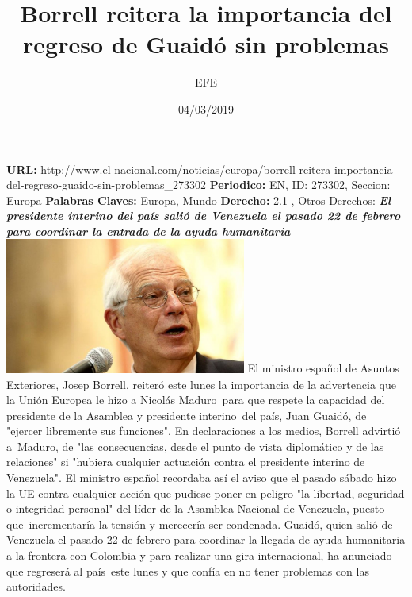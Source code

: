 \documentclass{article}%
\title{\textbf{Borrell reitera la importancia del regreso de Guaidó sin problemas}}%
\author{EFE}%
\date{04/03/2019}%
\begin{document}
%
\normalsize%
\maketitle%
\textbf{URL: }%
http://www.el{-}nacional.com/noticias/europa/borrell{-}reitera{-}importancia{-}del{-}regreso{-}guaido{-}sin{-}problemas\_273302\newline%
%
\textbf{Periodico: }%
EN, %
ID: %
273302, %
Seccion: %
Europa\newline%
%
\textbf{Palabras Claves: }%
Europa, Mundo\newline%
%
\textbf{Derecho: }%
2.1%
, Otros Derechos: %
\newline%
%
\textbf{\textit{El presidente interino del país salió de Venezuela el pasado 22 de febrero para coordinar la entrada de la ayuda humanitaria}}%
\newline%
\newline%
%
\includegraphics[width=300px]{EN_273302.jpg}%
\newline%
%
El ministro español de Asuntos Exteriores, Josep Borrell, reiteró este lunes la importancia de la advertencia que la Unión Europea le hizo a Nicolás Maduro~para que respete la capacidad del presidente de la Asamblea y presidente interino~del país, Juan Guaidó, de "ejercer libremente sus funciones".%
\newline%
%
En declaraciones a los medios, Borrell advirtió a~Maduro, de "las consecuencias, desde el punto de vista diplomático y de las relaciones" si "hubiera cualquier actuación contra el presidente interino de Venezuela".%
\newline%
%
El ministro español recordaba así el aviso que el pasado sábado hizo la UE contra cualquier acción que pudiese poner en peligro "la libertad, seguridad o integridad personal" del líder de la Asamblea Nacional de Venezuela, puesto que~incrementaría la tensión y merecería ser condenada.%
\newline%
%
Guaidó, quien salió de Venezuela el pasado 22 de febrero para coordinar la llegada de ayuda humanitaria a la frontera con Colombia y para realizar una gira internacional, ha anunciado que regreserá al país~este lunes y que confía en no tener problemas con las autoridades.%
\end{document}
